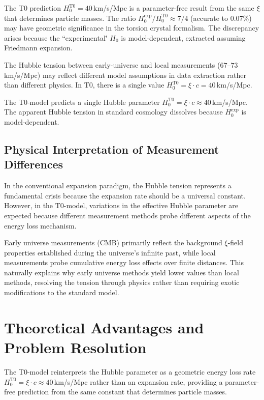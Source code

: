 	The T0 prediction $H_0^{\text{T0}} = 40\,$km/s/Mpc is a parameter-free result from the same $\xi$ that determines particle masses. The ratio $H_0^{\text{exp}}/H_0^{\text{T0}} \approx 7/4$ (accurate to $0.07\%$) may have geometric significance in the torsion crystal formalism. The discrepancy arises because the ``experimental\'\' $H_0$ is model-dependent, extracted assuming Friedmann expansion.
	
	The Hubble tension between early-universe and local measurements ($67$--$73\,$km/s/Mpc) may reflect different model assumptions in data extraction rather than different physics. In T0, there is a single value $H_0^{\text{T0}} = \xi \cdot c = 40\,$km/s/Mpc.
	
	\begin{experimental}
		The T0-model predicts a single Hubble parameter $H_0^{\text{T0}} = \xi \cdot c \approx 40\,$km/s/Mpc. The apparent Hubble tension in standard cosmology dissolves because $H_0^{\text{exp}}$ is model-dependent.
	\end{experimental}
	
	\subsection{Physical Interpretation of Measurement Differences}
	
	In the conventional expansion paradigm, the Hubble tension represents a fundamental crisis because the expansion rate should be a universal constant. However, in the T0-model, variations in the effective Hubble parameter are expected because different measurement methods probe different aspects of the energy loss mechanism.
	
	Early universe measurements (CMB) primarily reflect the background $\xi$-field properties established during the universe's infinite past, while local measurements probe cumulative energy loss effects over finite distances. This naturally explains why early universe methods yield lower values than local methods, resolving the tension through physics rather than requiring exotic modifications to the standard model.
	
	\section{Theoretical Advantages and Problem Resolution}
	
	The T0-model reinterprets the Hubble parameter as a geometric energy loss rate $H_0^{\text{T0}} = \xi \cdot c \approx 40\,$km/s/Mpc rather than an expansion rate, providing a parameter-free prediction from the same constant that determines particle masses.
	
